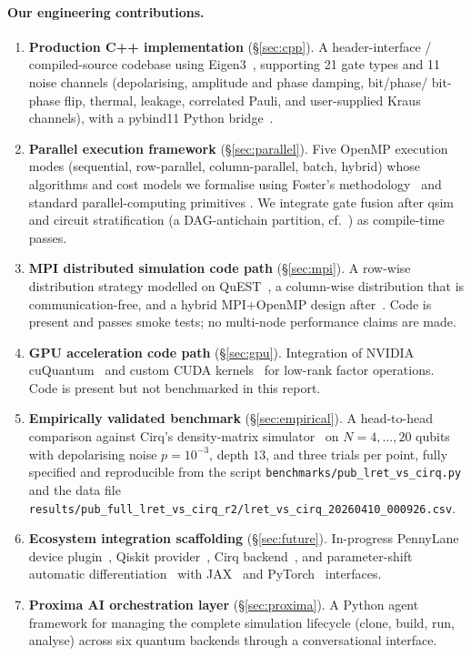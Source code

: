 \documentclass[11pt,a4paper]{article}
\begin{document}
\paragraph{Our engineering contributions.}
\begin{enumerate}
  \item \textbf{Production C++ implementation} (\S\ref{sec:cpp}). A header-interface /
        compiled-source codebase using Eigen3~\cite{eigen2010}, supporting 21 gate types
        and 11 noise channels (depolarising, amplitude and phase damping, bit/phase/
        bit-phase flip, thermal, leakage, correlated Pauli, and user-supplied Kraus
        channels), with a pybind11 Python bridge~\cite{pybind11}.
  \item \textbf{Parallel execution framework} (\S\ref{sec:parallel}). Five OpenMP
        execution modes (sequential, row-parallel, column-parallel, batch, hybrid)
        whose algorithms and cost models we formalise using Foster's
        methodology~\cite{foster1995} and standard parallel-computing primitives
        \cite{wilkinson2005,dagummenon1998}. We integrate gate fusion after
        qsim~\cite{qsim} and circuit stratification (a DAG-antichain partition, cf.\
        \cite{cormen2009}) as compile-time passes.
  \item \textbf{MPI distributed simulation code path} (\S\ref{sec:mpi}). A row-wise
        distribution strategy modelled on QuEST~\cite{jones2019quest}, a column-wise
        distribution that is communication-free, and a hybrid MPI+OpenMP design
        after~\cite{rabenseifner2009}. Code is present and passes smoke tests; no
        multi-node performance claims are made.
  \item \textbf{GPU acceleration code path} (\S\ref{sec:gpu}). Integration of
        NVIDIA cuQuantum~\cite{bayraktar2023cuquantum} and custom CUDA
        kernels~\cite{nickolls2008cuda} for low-rank factor operations. Code is present
        but not benchmarked in this report.
  \item \textbf{Empirically validated benchmark} (\S\ref{sec:empirical}). A head-to-head
        comparison against Cirq's density-matrix simulator~\cite{cirq} on $N=4,\ldots,20$
        qubits with depolarising noise $p=10^{-3}$, depth $13$, and three trials per
        point, fully specified and reproducible from the script
        \texttt{benchmarks/pub\_lret\_vs\_cirq.py} and the data file
        \texttt{results/pub\_full\_lret\_vs\_cirq\_r2/lret\_vs\_cirq\_20260410\_000926.csv}.
  \item \textbf{Ecosystem integration scaffolding} (\S\ref{sec:future}). In-progress
        PennyLane device plugin~\cite{bergholm2018pennylane}, Qiskit
        provider~\cite{javadi2024qiskit}, Cirq backend~\cite{cirq}, and parameter-shift
        automatic differentiation~\cite{mitarai2018,schuld2019} with JAX~\cite{jax} and
        PyTorch~\cite{paszke2019pytorch} interfaces.
  \item \textbf{Proxima AI orchestration layer} (\S\ref{sec:proxima}). A Python agent
        framework for managing the complete simulation lifecycle (clone, build, run,
        analyse) across six quantum backends through a conversational interface.
\end{enumerate}
\end{document}

